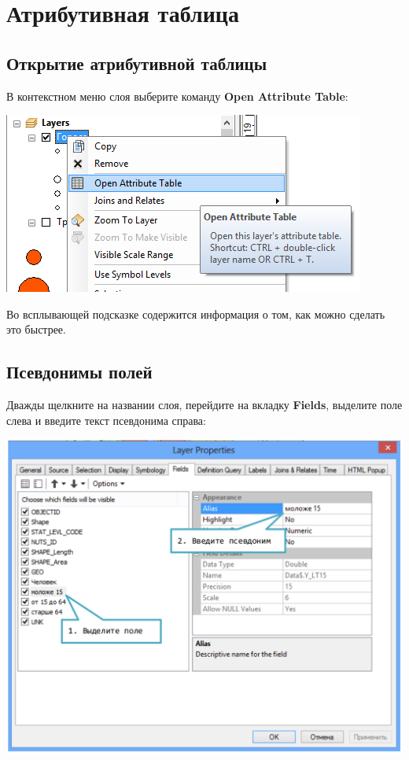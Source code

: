 \documentclass[12pt,]{book}
\begin{document}
\hypertarget{manual-attributes}{%
\chapter{Атрибутивная таблица}\label{manual-attributes}}

\hypertarget{section-34}{%
\section{Открытие атрибутивной таблицы}\label{section-34}}

В контекстном меню слоя выберите команду \textbf{Open Attribute Table}:

\includegraphics{images/Appendix/image68.png}

Во всплывающей подсказке содержится информация о том, как можно сделать это быстрее.

\hypertarget{section-35}{%
\section{Псевдонимы полей}\label{section-35}}

Дважды щелкните на названии слоя, перейдите на вкладку \textbf{Fields}, выделите поле слева и введите текст псевдонима справа:

\includegraphics{images/Appendix/image69.png}
\end{document}
